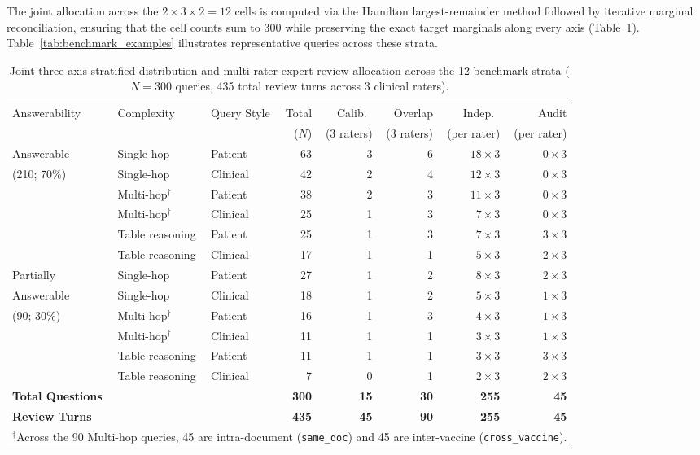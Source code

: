 \documentclass[sn-mathphys, oneside]{sn-jnl}
\newcommand{\artifact}[1]{\nolinkurl{#1}}
\begin{document}
The joint allocation across the $2 \times 3 \times 2 = 12$ cells is computed via the Hamilton largest-remainder method followed by iterative marginal reconciliation, ensuring that the cell counts sum to 300 while preserving the exact target marginals along every axis (Table~\ref{tab:dataset}). Table~\ref{tab:benchmark_examples} illustrates representative queries across these strata.

\begin{table}[htbp]
\centering
\caption{Joint three-axis stratified distribution and multi-rater expert review allocation across the 12 benchmark strata ($N=300$ queries, 435 total review turns across 3 clinical raters).}
\label{tab:dataset}
\begin{tabular}{lllrrrrr}
\toprule
Answerability & Complexity & Query Style & Total & Calib.\ & Overlap & Indep.\ & Audit\\
 & & & ($N$) & (3 raters) & (3 raters) & (per rater) & (per rater)\\
\midrule
Answerable & Single-hop & Patient & 63 & 3 & 6 & $18 \times 3$ & $0 \times 3$\\
(210; 70\%) & Single-hop & Clinical & 42 & 2 & 4 & $12 \times 3$ & $0 \times 3$\\
 & Multi-hop$^\dagger$ & Patient & 38 & 2 & 3 & $11 \times 3$ & $0 \times 3$\\
 & Multi-hop$^\dagger$ & Clinical & 25 & 1 & 3 & $7 \times 3$ & $0 \times 3$\\
 & Table reasoning & Patient & 25 & 1 & 3 & $7 \times 3$ & $3 \times 3$\\
 & Table reasoning & Clinical & 17 & 1 & 1 & $5 \times 3$ & $2 \times 3$\\
\midrule
Partially & Single-hop & Patient & 27 & 1 & 2 & $8 \times 3$ & $2 \times 3$\\
Answerable & Single-hop & Clinical & 18 & 1 & 2 & $5 \times 3$ & $1 \times 3$\\
(90; 30\%) & Multi-hop$^\dagger$ & Patient & 16 & 1 & 3 & $4 \times 3$ & $1 \times 3$\\
 & Multi-hop$^\dagger$ & Clinical & 11 & 1 & 1 & $3 \times 3$ & $1 \times 3$\\
 & Table reasoning & Patient & 11 & 1 & 1 & $3 \times 3$ & $3 \times 3$\\
 & Table reasoning & Clinical & 7 & 0 & 1 & $2 \times 3$ & $2 \times 3$\\
\midrule
\textbf{Total Questions} & & & \textbf{300} & \textbf{15} & \textbf{30} & \textbf{255} & \textbf{45}\\
\textbf{Review Turns} & & & \textbf{435} & \textbf{45} & \textbf{90} & \textbf{255} & \textbf{45}\\
\bottomrule
\multicolumn{8}{l}{\footnotesize $^\dagger$Across the 90 Multi-hop queries, 45 are intra-document (\artifact{same_doc}) and 45 are inter-vaccine (\artifact{cross_vaccine}).}
\end{tabular}
\end{table}
\end{document}
